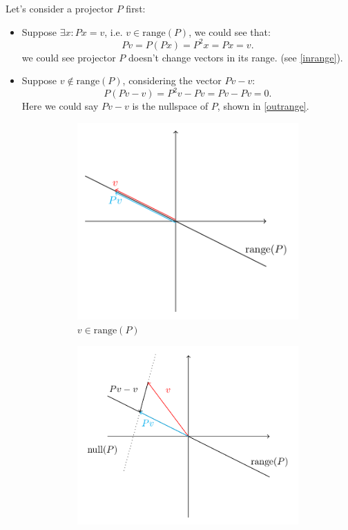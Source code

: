 \medskip
\noindent Let's consider a projector $P$ first:
\begin{itemize}
  \item Suppose $\exists x: Px=v$, i.e. $v \in \text{range}(P)$, we could see that:
    \[
      Pv = P(Px) = P^2x = Px = v
    .\]
    we could see projector $P$ doesn't change vectors in its range. (see \autoref{inrange}).
  \item Suppose $v \not\in \text{range}(P)$, considering the vector $Pv - v$:
     \[
       P(Pv - v) = P^2v - Pv = Pv - Pv = 0
    .\]
    Here we could say $Pv - v$ is the nullspace of $P$, shown in \autoref{outrange}.
  \begin{figure}[H]
    \centering
  \captionsetup[subfigure]{justification=centering}
  \begin{subfigure}[b]{0.45\textwidth}
    \centering
    \includegraphics[width=\textwidth]{imgs/inline.png}
    \caption{$v \in \text{range}(P)$}%
    \label{inrange}
    \end{subfigure}
    \hfill
    \begin{subfigure}[b]{0.5\textwidth}
      \centering
      \includegraphics[width=\textwidth]{imgs/outrange.png}

\end{subfigure}
\end{figure}
\end{itemize}
